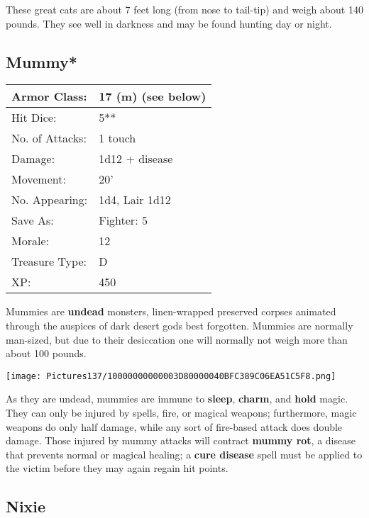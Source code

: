 \documentclass[a4paper,twoside,openany,10pt]{book}
\begin{document}
\begin{multicols}{2}
These great cats are about 7 feet long (from nose to tail-tip) and weigh about 140 pounds. They see well in darkness and may be found hunting day
or night.

\subsection*{Mummy*}\label{mummy}

\begin{tabularx}{0.50\textwidth}{@{}lX@{}} 
Armor Class: & 17 (m) (see below) \\\hline
Hit Dice: & 5** \\\hline
No. of Attacks: & 1 touch \\\hline
Damage: & 1d12 + disease \\\hline
Movement: & 20' \\\hline
No. Appearing: & 1d4, Lair 1d12 \\\hline
Save As: & Fighter: 5 \\\hline
Morale: & 12 \\\hline
Treasure Type: & D \\\hline
XP: & 450 \\\hline
\end{tabularx}\medskip

Mummies are \textbf{undead} monsters, linen-wrapped preserved corpses animated through the auspices of dark desert gods best forgotten. Mummies are normally man-sized, but due to their desiccation one will normally not weigh more than about 100 pounds.


\begin{center} \texttt{[image: Pictures137/10000000000003D80000040BFC389C06EA51C5F8.png]} \end{center}

As they are undead, mummies are immune to \textbf{sleep}, \textbf{charm}, and \textbf{hold} magic. They can only be injured by spells, fire, or magical weapons; furthermore, magic weapons do only half damage, while any sort of fire-based attack does double damage. Those injured by mummy attacks will contract \textbf{mummy rot}, a disease that prevents normal or magical healing; a \textbf{cure disease }spell must be applied to the victim before they may again regain hit points.

\subsection*{Nixie}\label{nixie}


\end{multicols}
\end{document}
